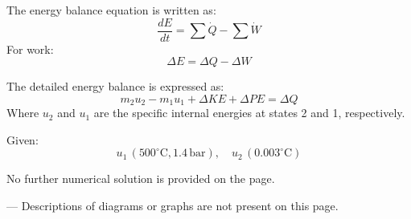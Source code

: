 The energy balance equation is written as:  
\[
\frac{dE}{dt} = \sum \dot{Q} - \sum \dot{W}
\]  
For work:  
\[
\Delta E = \Delta Q - \Delta W
\]  

The detailed energy balance is expressed as:  
\[
m_2 u_2 - m_1 u_1 + \Delta KE + \Delta PE = \Delta Q
\]  
Where \( u_2 \) and \( u_1 \) are the specific internal energies at states 2 and 1, respectively.  

Given:  
\[
u_1 \, (500^\circ\text{C}, 1.4 \, \text{bar}), \quad u_2 \, (0.003^\circ\text{C})
\]  

No further numerical solution is provided on the page.  

---  
Descriptions of diagrams or graphs are not present on this page.